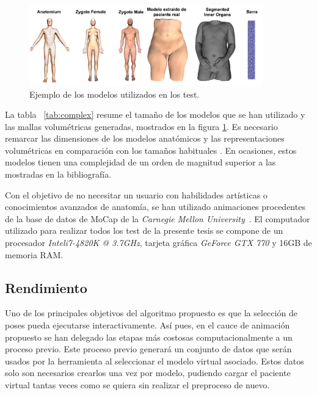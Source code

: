\begin{figure}[h]%
  \centering
  \includegraphics[width=0.90\textwidth]{IMG/modelos}
    \caption{Ejemplo de los modelos utilizados en los test.}
    \label{fig:models}
\end{figure}

La tabla ~\ref{tab:complex} resume el tamaño de los modelos que se han utilizado y las mallas volumétricas generadas, mostrados en la figura \ref{fig:models}. Es necesario remarcar las dimensiones de los modelos anatómicos y las representaciones volumétricas en comparación con los tamaños habituales 
. 
En ocasiones, estos modelos tienen una complejidad de un orden de magnitud superior a las mostradas en la bibliografía.

Con el objetivo de no necesitar un usuario con habilidades artísticas o conocimientos avanzados de anatomía, se han utilizado animaciones procedentes de la base de datos de \ac{MoCap} de la \emph{Carnegie Mellon University}~\cite{CMUMCD}. El computador utilizado para realizar todos los test de la presente tesis se compone de un procesador \emph{Intel\textregistered i7-4820K @ 3.7GHz}, tarjeta gráfica \emph{GeForce GTX 770} y 16GB de memoria \acs{RAM}.


\subsection{Rendimiento}

Uno de los principales objetivos del algoritmo propuesto es que la selección de poses pueda ejecutarse interactivamente. Así pues, en el cauce de animación propuesto se han delegado las etapas más costosas computacionalmente a un proceso previo. Este proceso previo generará un conjunto de datos que serán usados por la herramienta al seleccionar el modelo virtual asociado. Estos datos solo son necesarios crearlos una vez por modelo, pudiendo cargar el paciente virtual tantas veces como se quiera sin realizar el preproceso de nuevo. 



